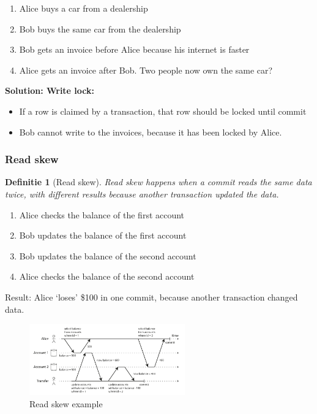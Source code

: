 \documentclass{article}
\newtheorem{theorem}{Definitie}[section]
\begin{document}
\begin{enumerate}
    \item Alice buys a car from a dealership
    \item Bob buys the same car from the dealership
    \item Bob gets an invoice before Alice because his internet is faster
    \item Alice gets an invoice after Bob. Two people now own the same car?
\end{enumerate}

\textbf{Solution: Write lock:}

\begin{itemize}
    \item If a row is claimed by a transaction, that row should be locked until commit
    \item Bob cannot write to the invoices, because it has been locked by Alice.
\end{itemize}

\subsubsection{Read skew}

\begin{theorem}[Read skew]
Read skew happens when a commit reads the same data twice, 
with different results because another transaction updated the data.
\end{theorem}

\begin{enumerate}
    \item Alice checks the balance of the first account
    \item Bob updates the balance of the first account
    \item Bob updates the balance of the second account
    \item Alice checks the balance of the second account
\end{enumerate}

Result: Alice `loses' \$100 in one commit, because another transaction changed data.

\begin{figure}[H]
    \centering
    \includegraphics[width=0.6\textwidth]{read-skew.png}
    \caption{Read skew example}
\end{figure}
\end{document}
